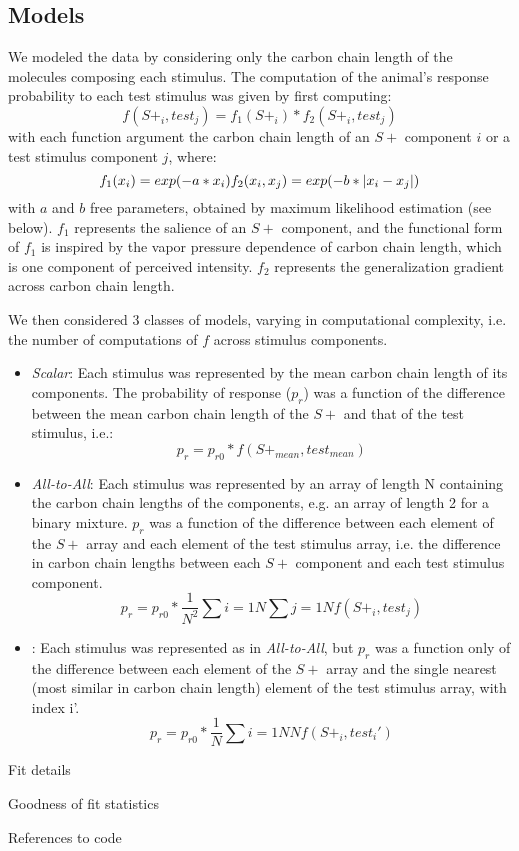 \subsection*{Models}
\label{sec:methods_models}

We modeled the data by considering only the carbon chain length of the molecules composing each stimulus.  
The computation of the animal's response probability to each test stimulus was given by first computing: 
\begin{equation}
f(S+_i,test_j) = f_1(S+_i) * f_2(S+_i,test_j)
\end{equation}
with each function argument the carbon chain length of an $S+$ component $i$ or a test stimulus component $j$, where:
\begin{equation}
f_1(x_i) = exp(-a*x_i) \\
f_2(x_i,x_j) = exp(-b*|x_i-x_j|)
\end{equation}
with $a$ and $b$ free parameters, obtained by maximum likelihood estimation (see below).  
$f_1$ represents the salience of an $S+$ component, and the functional form of $f_1$ is inspired by the vapor pressure dependence of carbon chain length, which is one component of perceived intensity.  $f_2$ represents the generalization gradient across carbon chain length.  

We then considered 3 classes of models, varying in computational complexity, i.e. the number of computations of $f$ across stimulus components.  
\begin{itemize}
\item \textit{Scalar}: Each stimulus was represented by the mean carbon chain length of its components.  The probability of response ($p_r$) was a function of the difference between the mean carbon chain length of the $S+$ and that of the test stimulus, i.e.:
\begin{equation}
p_r = p_{r0} * f(S+_{mean},test_{mean})
\end{equation}
\item \textit{All-to-All}: Each stimulus was represented by an array of length N containing the carbon chain lengths of the components, e.g. an array of length 2 for a binary mixture. $p_r$ was a function of the difference between each element of the $S+$ array and each element of the test stimulus array, i.e. the difference in carbon chain lengths between each $S+$ component and each test stimulus component.  
\begin{equation}
p_r = p_{r0} * \frac{1}{N^2}\sum{i=1}{N}\sum{j=1}{N}f(S+_i,test_j)
\end{equation}
\item {}: Each stimulus was represented as in \textit{All-to-All}, but $p_r$ was a function only of the difference between each element of the $S+$ array and the single nearest (most similar in carbon chain length) element of the test stimulus array, with index i'.  
\begin{equation}
p_r = p_{r0} * \frac{1}{N}\sum{i=1}{N}{N}f(S+_i,test_i')
\end{equation}
\end{itemize}

\item Fit details
\item Goodness of fit statistics
\item References to code
